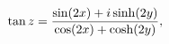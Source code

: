 \[\mathop{\tan\/}\nolimits z=\frac{\mathop{\sin\/}\nolimits\!\left(2x\right)+i%
\mathop{\sinh\/}\nolimits\!\left(2y\right)}{\mathop{\cos\/}\nolimits\!\left(2x%
\right)+\mathop{\cosh\/}\nolimits\!\left(2y\right)},\]